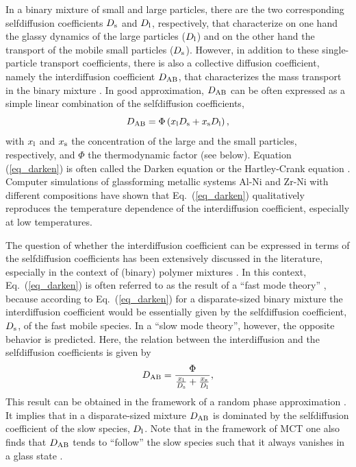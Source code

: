 In a binary mixture of small and large particles, there are the two corresponding selfdiffusion coefficients $D_{\rm s}$ and $D_{\rm l}$, respectively, that characterize on one hand the glassy dynamics of the large particles ($D_{\rm l}$) and on the other hand the transport of the mobile small particles ($D_{\rm s}$). However, in addition to these single-particle transport coefficients, there is also a collective diffusion coefficient, namely the interdiffusion coefficient $D_{\rm AB}$, that characterizes the mass transport in the binary mixture \cite{fitts1962, akcasu1997, horbach2007}. In good approximation, $D_{\rm AB}$ can be often expressed as a simple linear combination of the selfdiffusion coefficients,
%
\begin{equation}
D_{\rm AB} = \Phi \left( x_{\rm l} D_{\rm s} + x_{\rm s} D_{\rm l} \right), 
\label{eq_darken}
\end{equation}
%
with $x_{\rm l}$ and $x_{\rm s}$ the concentration of the large and the small particles, respectively, and $\Phi$ the thermodynamic factor (see below). Equation (\ref{eq_darken}) is often called  the Darken equation \cite{darken1949} or the Hartley-Crank equation \cite{hartley1949}.  Computer simulations of glassforming metallic systems Al-Ni and Zr-Ni with different compositions \cite{horbach2007, kuhn2014} have shown that Eq.~(\ref{eq_darken}) qualitatively reproduces the temperature dependence of the interdiffusion coefficient, especially at low temperatures.  

The question of whether the interdiffusion coefficient can be expressed in terms of the selfdiffusion coefficients has been extensively discussed in the literature, especially in the context of (binary) polymer mixtures \cite{akcasu1997, bearman1960, brochard1986, sillescu1987, akcasu1991, hess1990}.  In this context, Eq.~(\ref{eq_darken}) is often referred to as the result of a ``fast mode theory'' \cite{akcasu1997}, because according to Eq.~(\ref{eq_darken}) for a disparate-sized binary mixture the interdiffusion coefficient would be essentially given by the selfdiffusion coefficient, $D_{\rm s}$, of the fast mobile species.  In a ``slow mode theory'', however, the opposite behavior is predicted.  Here, the relation between the interdiffusion and the selfdiffusion coefficients is given by \cite{hess1990}
%
\begin{equation}
D_{\rm AB} = \frac{\Phi}{\frac{x_{\rm l}}{D_{\rm s}} + \frac{x_{\rm s}}{D_{\rm l}}}, 
\label{eq_slowm}
\end{equation}
%
This result can be obtained in the framework of a random phase approximation \cite{akcasu1997}.  It implies that in a disparate-sized mixture $D_{\rm AB}$ is dominated by the selfdiffusion coefficient of the slow species, $D_{\rm l}$.  Note that in the framework of MCT one also finds that $D_{\rm AB}$ tends to ``follow'' the slow species such that it always vanishes in a glass state \cite{latz1990}.

